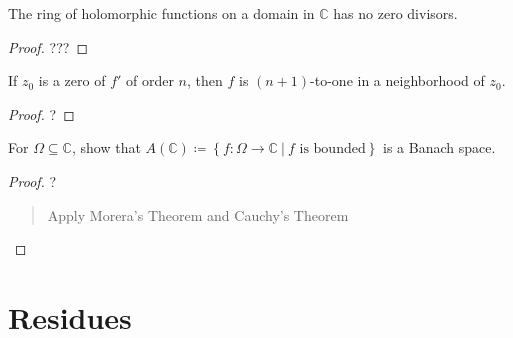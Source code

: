 \begin{corollary}

The ring of holomorphic functions on a domain in \({\mathbb{C}}\) has no
zero divisors.

\end{corollary}


\begin{proof}

???

\end{proof}

\begin{proposition}

If \(z_0\) is a zero of \(f'\) of order \(n\), then \(f\) is
\((n+1)\)-to-one in a neighborhood of \(z_0\).

\end{proposition}

\begin{proof}

?

\end{proof}

\begin{proposition}

For \(\Omega\subseteq{\mathbb{C}}\), show that
\(A({\mathbb{C}})\coloneqq\left\{{f: \Omega \to {\mathbb{C}}{~\mathrel{\Big|}~}f\text{ is bounded}}\right\}\)
is a Banach space.

\end{proposition}

\begin{proof}

?

\begin{quote}
Apply Morera's Theorem and Cauchy's Theorem
\end{quote}

\end{proof}

\hypertarget{residues}{%
\section{Residues}\label{residues}}

